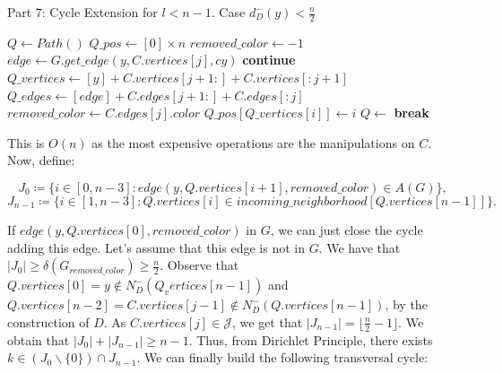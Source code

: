 \begin{algorithm}[H]
    \caption{Part 7: Cycle Extension for \( l < n - 1 \). Case \( d^-_D(y) < \frac{n}{2} \)}
    \begin{algorithmic}[1]
            \State $Q \gets Path()$
            \State $Q\_pos \gets [0] \times n$
            \State $removed\_color \gets -1$
                \State $edge \gets G.get\_edge(y, C.vertices[j], cy)$
                    \State \textbf{continue}
                \EndIf
                \State $Q\_vertices \gets [y] + C.vertices[j + 1:] + C.vertices[:j + 1]$
                \State $Q\_edges \gets [edge] + C.edges[j + 1:] + C.edges[:j]$
                \State $removed\_color \gets C.edges[j].color$
                    \State $Q\_pos[Q\_vertices[i]] \gets i$
                \EndFor
                \State $Q \gets$ 
                \State \textbf{break}
            \EndFor
        \EndFunction
    \end{algorithmic}
\end{algorithm}

This is $O(n)$ as the most expensive operations are the manipulations on $C$.
Now, define:

\begin{equation}
    J_0 \coloneqq \{i \in [0, n - 3]: edge(y, Q.vertices[i+1], removed\_color) \in A(G)\},
\end{equation}
\begin{equation}
    J_{n-1} \coloneqq \{i \in [1, n - 3] : Q.vertices[i] \in incoming\_neighborhood[Q.vertices[n-1]]\}.
\end{equation}

If $edge(y, Q.vertices[0], removed\_color)$ in $G$, we can just close the cycle adding this edge.
Let's assume that this edge is not in $G$. We have that $|J_0| \geq \delta(G_{removed\_color}) \geq \frac{n}{2}$.
Observe that $Q.vertices[0] = y \notin N^-_D(Q_vertices[n - 1])$ and $Q.vertices[n - 2] = C.vertices[j - 1] \notin N^-_D(Q.vertices[n - 1])$,
by the construction of $D$. As $C.vertices[j] \in \mathcal{J}$, we get that
$|J_{n-1}| = \lfloor \frac{n}{2} - 1 \rfloor$. We obtain that $|J_0| + |J_{n-1}| \geq n - 1$.
Thus, from Dirichlet Principle, there exists $k \in (J_0 \backslash \{0\}) \cap J_{n-1}$. 
We can finally build the following transversal cycle:

